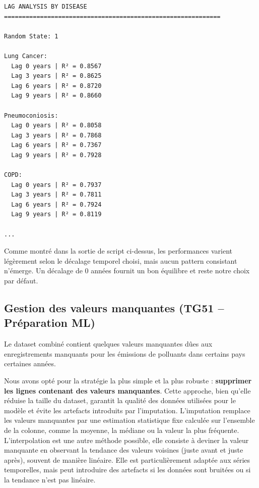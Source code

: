 \documentclass[11pt,a4paper]{article}
\begin{document}
\begin{listing}[H]
\caption{Analyse des décalages temporels par maladie}
\label{lst:lag_analysis}
\begin{lstlisting}[style=textstyle]
LAG ANALYSIS BY DISEASE
============================================================

Random State: 1

Lung Cancer:
  Lag 0 years | R² = 0.8567
  Lag 3 years | R² = 0.8625
  Lag 6 years | R² = 0.8720
  Lag 9 years | R² = 0.8660

Pneumoconiosis:
  Lag 0 years | R² = 0.8058
  Lag 3 years | R² = 0.7868
  Lag 6 years | R² = 0.7367
  Lag 9 years | R² = 0.7928

COPD:
  Lag 0 years | R² = 0.7937
  Lag 3 years | R² = 0.7811
  Lag 6 years | R² = 0.7924
  Lag 9 years | R² = 0.8119

...
\end{lstlisting}
\end{listing}

Comme montré dans la sortie de script ci-dessus, les performances varient légèrement selon le décalage temporel choisi, mais aucun pattern consistant n'émerge. Un décalage de 0 années fournit un bon équilibre et reste notre choix par défaut.

\clearpage
\subsection{Gestion des valeurs manquantes (TG51 -- Préparation ML)}

Le dataset combiné contient quelques valeurs manquantes dûes aux enregistrements manquants pour les émissions de polluants dans certains pays certaines années.

Nous avons opté pour la stratégie la plus simple et la plus robuste : \textbf{supprimer les lignes contenant des valeurs manquantes}. Cette approche, bien qu'elle réduise la taille du dataset, garantit la qualité des données utilisées pour le modèle et évite les artefacts introduits par l'imputation. L'imputation remplace les valeurs manquantes par une estimation statistique fixe calculée sur l'ensemble de la colonne, comme la moyenne, la médiane ou la valeur la plus fréquente. L'interpolation est une autre méthode possible, elle consiste à deviner la valeur manquante en observant la tendance des valeurs voisines (juste avant et juste après), souvent de manière linéaire. Elle est particulièrement adaptée aux séries temporelles, mais peut introduire des artefacts si les données sont bruitées ou si la tendance n'est pas linéaire.
\end{document}
